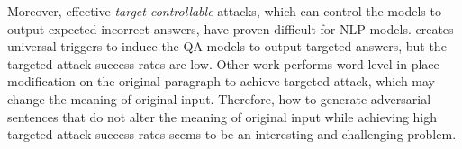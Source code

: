 Moreover, effective \textit{target-controllable} attacks, which can control the models to output expected incorrect answers, have proven difficult for NLP models. \citet{wallace-etal-2019-universal} creates universal triggers to induce the QA models to output targeted answers, but the targeted attack success rates are low. Other work \citep{seq2sick, TextFooler, zhang-etal-2019-generating-fluent,Zang2019TextualAA} performs word-level in-place modification on the original paragraph to achieve targeted attack, which may change the meaning of original input. Therefore, how to generate adversarial sentences that do not alter the meaning of original input while achieving high targeted attack success rates seems to be an interesting and challenging problem.

